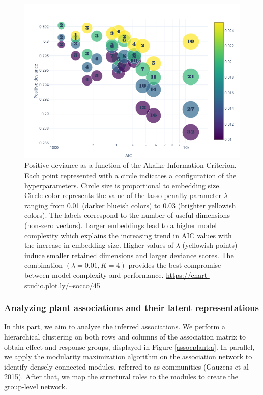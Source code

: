 \documentclass[]{article}
\begin{document}
\begin{figure}[H]
	\centering
	\includegraphics[scale=0.5]{gridaravo}
	\caption{Positive deviance as a function of the Akaike Information Criterion. Each point represented with a circle indicates a configuration of the hyperparameters. Circle size is proportional to embedding size. Circle color represents the value of the lasso penalty parameter $\lambda$ ranging from 0.01 (darker blueish colors) to 0.03 (brighter yellowish colors). The labels correspond to the number of useful dimensions (non-zero vectors). Larger embeddings lead to a higher model complexity which explains the increasing trend in AIC values with the increase in embedding size. Higher values of $\lambda$ (yellowish points) induce smaller retained dimensions and larger deviance scores. The combination $(\lambda=0.01,K=4)$ provides the best compromise between model complexity and performance.  \url{https://chart-studio.plot.ly/~socco/45}}
	\label{gridaravo}
\end{figure}

\subsubsection{Analyzing plant associations and their latent representations}
In this part, we aim to analyze the inferred associations. We perform a hierarchical clustering on both rows and columns of the association matrix to obtain effect and response groups, displayed in Figure \ref{assocplant:a}. In parallel, we apply the modularity maximization algorithm on the association network to identify densely connected modules, referred to as communities (Gauzens et al 2015). After that, we map the structural roles to the modules to create the group-level network. \\
\end{document}
